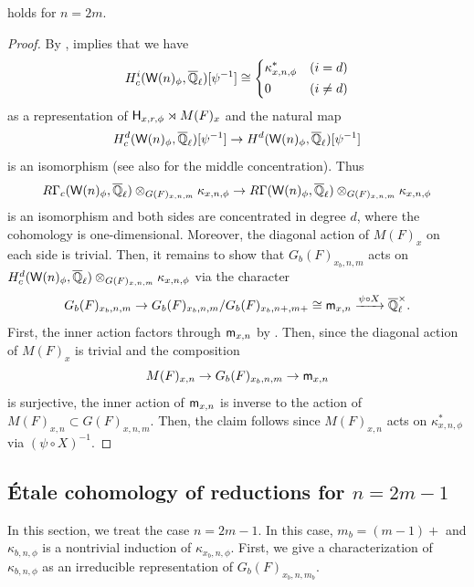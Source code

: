 \documentclass[12pt,reqno]{amsart}
\begin{document}
\begin{prop} \label{prop:cohmology_reduction_even}
     holds for $n = 2m$. 
\end{prop}
\begin{proof}
    By , \cite[Theorem 6]{Tak26_Yu} implies that we have
    \[
        H_c^i({\mathsf{W}}(n)_\phi, {\overline{\mathbb{Q}}_\ell})[\psi^{-1}] \cong 
        \left\{ \begin{alignedat}{4}
            & \kappa_{x, n, \phi}^* & \quad & (i = d) \\
            & 0 & \quad & (i \neq d)
        \end{alignedat}
        \right.
    \]
    as a representation of ${\mathsf{H}}_{x, r, \phi} \rtimes M(F)_x$ and the natural map  
    \[
        H_c^d({\mathsf{W}}(n)_\phi, {\overline{\mathbb{Q}}_\ell})[\psi^{-1}] \to H^d({\mathsf{W}}(n)_\phi, {\overline{\mathbb{Q}}_\ell})[\psi^{-1}]
    \]
    is an isomorphism (see also \cite[Lemma 6.1]{Tak26_Yu} for the middle concentration). Thus
    \[
        R\Gamma_c({\mathsf{W}}(n)_\phi, {\overline{\mathbb{Q}}_\ell}) \otimes_{G(F)_{x, n, m}} \kappa_{x, n, \phi} \to R\Gamma({\mathsf{W}}(n)_\phi, {\overline{\mathbb{Q}}_\ell}) \otimes_{G(F)_{x, n, m}} \kappa_{x, n, \phi}
    \]
    is an isomorphism and both sides are concentrated in degree \(d\), where the cohomology is one-dimensional. Moreover, the diagonal action of $M(F)_x$ on each side is trivial. Then, it remains to show that $G_b(F)_{x_b, n, m}$ acts on $H_c^d({\mathsf{W}}(n)_\phi, {\overline{\mathbb{Q}}_\ell}) \otimes_{G(F)_{x, n, m}} \kappa_{x, n, \phi}$ via the character 
    \[
        G_b(F)_{x_b, n, m} \to G_b(F)_{x_b, n, m} / G_b(F)_{x_b, n+, m+} \cong {\mathsf{m}}_{x, n} \xrightarrow{\psi \circ X} {\overline{\mathbb{Q}}_\ell^\times}. 
    \]
    First, the inner action factors through ${\mathsf{m}}_{x, n}$ by . Then, since the diagonal action of $M(F)_x$ is trivial and the composition
    \[
        M(F)_{x, n} \to G_b(F)_{x_b, n, m} \to {\mathsf{m}}_{x, n}
    \]
    is surjective, the inner action of ${\mathsf{m}}_{x, n}$ is inverse to the action of $M(F)_{x, n} \subset G(F)_{x, n, m}$. Then, the claim follows since $M(F)_{x, n}$ acts on $\kappa_{x, n, \phi}^*$ via $(\psi \circ X)^{-1}$. 
\end{proof}


\subsection{\'{E}tale cohomology of reductions for $n = 2m - 1$} \label{ssec:cohomology_reduction_odd}

In this section, we treat the case $n = 2m - 1$. In this case, $m_b = (m-1)+$ and $\kappa_{b, n, \phi}$ is a nontrivial induction of $\kappa_{x_b, n, \phi}$. First, we give a characterization of $\kappa_{b, n, \phi}$ as an irreducible representation of $G_b(F)_{x_b, n, m_b}$. 
\end{document}
